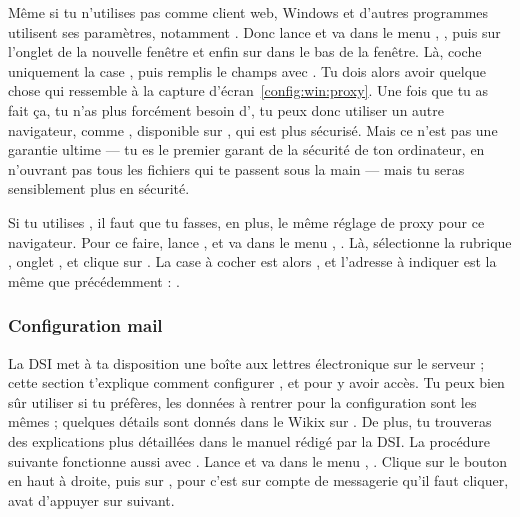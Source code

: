 M\^eme si tu n'utilises pas  comme client web, Windows et d'autres programmes
utilisent ses param\`etres, notamment . Donc lance  et va
dans le menu , , puis sur l'onglet  de la
nouvelle fen\^etre et enfin sur  dans le bas de la fen\^etre. L\`a, coche
uniquement la case , puis remplis le champs
 avec . Tu dois alors avoir quelque chose qui
ressemble \`a la capture d'\'ecran~\ref{config:win:proxy}.
\setcounter{page}{33}
Une fois que tu as fait \c{c}a, tu n'as plus forc\'ement besoin d', tu peux donc utiliser un autre navigateur, comme , disponible sur \xshare, qui est plus s\'ecuris\'e. Mais ce n'est pas une garantie ultime --- tu es le premier garant de la s\'ecurit\'e de ton
ordinateur, en n'ouvrant pas tous les fichiers qui te passent sous la main
--- mais tu seras sensiblement plus en s\'ecurit\'e.


Si tu utilises , il faut que tu fasses, en plus, le m\^eme r\'eglage de proxy pour
ce navigateur. Pour ce faire, lance , et va dans le menu ,
. L\`a, s\'electionne la rubrique , onglet , et clique sur
. La case \`a cocher est alors ,
et l'adresse \`a indiquer est la m\^eme que pr\'ec\'edemment : .





\subsubsection{Configuration mail}

La DSI met \`a ta disposition une bo\^{i}te aux lettres \'electronique sur
le serveur  ; cette section t'explique comment
configurer , et  pour y avoir acc\`es. Tu peux bien
s\^{u}r utiliser  si tu pr\'ef\`eres, les donn\'ees \`a rentrer
pour la configuration sont les m\^emes ; quelques d\'etails sont donn\'es
dans le Wikix sur \fkz. De plus, tu trouveras des explications plus
d\'etaill\'ees dans le manuel r\'edig\'e par la DSI.
La proc\'edure suivante fonctionne aussi avec .
Lance  et va dans le menu ,
. Clique sur le bouton  en
haut \`a droite, puis sur , pour  c'est sur compte de messagerie qu'il faut cliquer, avat d'appuyer sur suivant.

